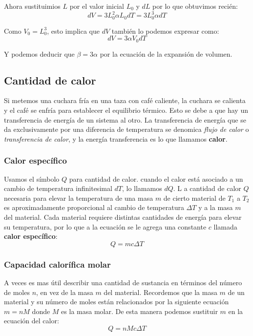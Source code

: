 \documentclass[12pt]{article}
\begin{document}
  Ahora sustituimios $ L $ por el valor inicial $ L_{0} $ y $ dL $ por lo que obtuvimos recién:
  \[
  dV = 3L_{0}^{2}\alpha L_{0}dT = 3L_{0}^{3}\alpha dT
  \]

  Como $ V_{0} = L_{0}^{3} $, esto implica que $ dV $ también lo podemos expresar como:
  \[
  dV = 3\alpha V_{0}dT
  \]

  Y podemos deducir que $ \beta = 3\alpha $ por la ecuación de la expansión de volumen.
  
  \subsection{Cantidad de calor}
  Si metemos una cuchara fría en una taza con café caliente, la cuchara se calienta y el café se enfría para establecer el equilibrio térmico. Esto se debe a que hay un transferencia de energía de un sistema al otro. La transferencia de energía que se da exclusivamente por una diferencia de temperatura se denomica \textit{flujo de calor} o \textit{transferencia de calor}, y la energía transferencia es lo que llamamos \textbf{calor}.

  \subsubsection{Calor específico}
  Usamos el símbolo $ Q $ para cantidad de calor. cuando el calor está asociado a un cambio de temperatura infinitesimal $ dT $, lo llamamos $ dQ $. L a cantidad de calor $ Q $ necesaria para elevar la temperatura de una masa $ m $ de cierto material de $ T_{1} $ a $ T_{2} $ es aproximadamente proporcional al cambio de temperatura $ \Delta T $ y a la masa $ m $ del material. Cada material requiere distintas cantidades de energía para elevar su temperatura, por lo que a la ecuación se le agrega una constante $ c $ llamada \textbf{calor específico}:
  \[
  Q = mc\Delta T
  \]

  \vspace{0.2cm}

  \subsubsection{Capacidad calorífica molar}
  A veces es mas útil describir una cantidad de sustancia en términos del número de moles $ n $, en vez de la masa $ m $ del material. Recordemos que la masa $ m $ de un material y su número de moles están relacionados por la siguiente ecuación $ m = nM $ donde $ M $ es la masa molar. De esta manera podemos sustituir $ m $ en la ecuación del calor:
  \[
  Q = nMc\Delta T
  \]
\end{document}
